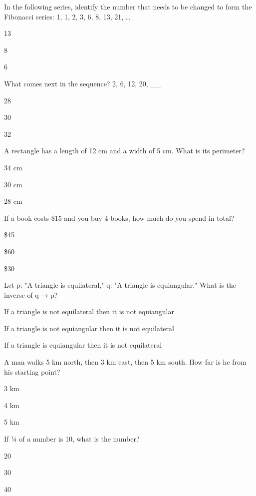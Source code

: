 
\begin{enhancedmcq}{In the following series, identify the number that needs to be changed to form the Fibonacci series:}
   1, 1, 2, 3, 6, 8, 13, 21, …  
\item 13
\item 8
\item 6

\end{enhancedmcq}
\begin{enhancedmcq}{What comes next in the sequence?}
   2, 6, 12, 20, __  
\item 28
\item 30
\item 32

\end{enhancedmcq}
\begin{enhancedmcq}{A rectangle has a length of 12 cm and a width of 5 cm. What is its perimeter?}
\item 34 cm
\item 30 cm
\item 28 cm

\end{enhancedmcq}
\begin{enhancedmcq}{If a book costs \$15 and you buy 4 books, how much do you spend in total?}
\item \$45
\item \$60
\item \$30

\end{enhancedmcq}
\begin{enhancedmcq}{Let p: "A triangle is equilateral," q: "A triangle is equiangular." What is the inverse of q → p?}
\item If a triangle is not equilateral then it is not equiangular
\item If a triangle is not equiangular then it is not equilateral
\item If a triangle is equiangular then it is not equilateral

\end{enhancedmcq}
\begin{enhancedmcq}{A man walks 5 km north, then 3 km east, then 5 km south. How far is he from his starting point?}
\item 3 km
\item 4 km
\item 5 km

\end{enhancedmcq}
\begin{enhancedmcq}{If ¼ of a number is 10, what is the number?}
\item 20
\item 30
\item 40

\end{enhancedmcq}
